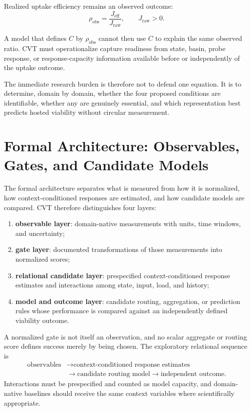 \documentclass[11pt]{article}
\begin{document}
\begin{samepage}
Realized uptake efficiency remains an observed outcome:
\begin{equation}
    \rho_{\mathrm{obs}}
    =
    \frac{J_{\mathrm{eff}}}{J_{\mathrm{raw}}},
    \qquad J_{\mathrm{raw}}>0.
\end{equation}
\end{samepage}
A model that defines \(C\) by \(\rho_{\mathrm{obs}}\) cannot then use \(C\) to explain the same observed ratio. CVT must operationalize capture readiness from state, basin, probe response, or response-capacity information available before or independently of the uptake outcome.

The immediate research burden is therefore not to defend one equation. It is to determine, domain by domain, whether the four proposed conditions are identifiable, whether any are genuinely essential, and which representation best predicts hosted viability without circular measurement.

\section{Formal Architecture: Observables, Gates, and Candidate Models}
\label{sec:formal}

The formal architecture separates what is measured from how it is normalized, how context-conditioned responses are estimated, and how candidate models are compared. CVT therefore distinguishes four layers:
\begin{enumerate}[label=(\roman*)]
    \item \textbf{observable layer}: domain-native measurements with units, time windows, and uncertainty;
    \item \textbf{gate layer}: documented transformations of those measurements into normalized scores;
    \item \textbf{relational candidate layer}: prespecified context-conditioned response estimates and interactions among state, input, load, and history;
    \item \textbf{model and outcome layer}: candidate routing, aggregation, or prediction rules whose performance is compared against an independently defined viability outcome.
\end{enumerate}
A normalized gate is not itself an observation, and no scalar aggregate or routing score defines success merely by being chosen. The exploratory relational sequence is
\[
\begin{aligned}
\text{observables}
&\longrightarrow
\text{context-conditioned response estimates}
\\
&\longrightarrow
\text{candidate routing model}
\longrightarrow
\text{independent outcome}.
\end{aligned}
\]
Interactions must be prespecified and counted as model capacity, and domain-native baselines should receive the same context variables where scientifically appropriate.
\end{document}

